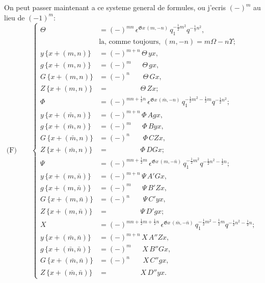 \documentclass[11pt,a4paper]{book}
\begin{document}
On peut passer maintenant a ce systeme general de formules, ou j'ecris $(-)^m$ au
lieu de $(-1)^m$:
\begin{equation*}
\text{(F)}\qquad
\left\{
\begin{aligned}
\Theta &= (-)^{mn}\, \epsilon^{\mathfrak{G}x\, (m, -n)}\, q_1^{-\frac{1}{2}m^2} q^{-\frac{1}{2}n^2},\\
&\text{la, comme toujours, } (m, -n) = m\Omega - n\Upsilon;\\
y\, \{x + (m, n)\} &= (-)^{m+n}\, \Theta\, yx,\\
g\, \{x + (m, n)\} &= (-)^m \phantom{+n}\, \Theta\, gx,\\
G\, \{x + (m, n)\} &= (-)^n \phantom{+m}\, \Theta\, Gx,\\
Z\, \{x + (m, n)\} &= \phantom{(-)^{m+n}} \Theta\, Zx;\\
\Phi &= (-)^{mn+\frac{1}{2}n}\, \epsilon^{\mathfrak{G}x\, (\bar{m}, -n)}\, q_1^{-\frac{1}{2}m^2 - \frac{1}{2}m} q^{-\frac{1}{2}n^2};\\
y\, \{x + (\bar{m}, n)\} &= (-)^{m+n}\, \Phi\, Agx,\\
g\, \{x + (\bar{m}, n)\} &= (-)^m \phantom{+n}\, \Phi\, Byx,\\
G\, \{x + (\bar{m}, n)\} &= (-)^n \phantom{+m}\, \Phi\, CZx,\\
Z\, \{x + (\bar{m}, n)\} &= \phantom{(-)^{m+n}} \Phi\, DGx;\\
\Psi &= (-)^{mn+\frac{1}{2}m}\, \epsilon^{\mathfrak{G}x\, (m, -\bar{n})}\, q_1^{-\frac{1}{2}m^2} q^{-\frac{1}{2}n^2 - \frac{1}{2}n};\\
y\, \{x + (m, \bar{n})\} &= (-)^{m+n}\, \Psi\, A'Gx,\\
g\, \{x + (m, \bar{n})\} &= (-)^m \phantom{+n}\, \Psi\, B'Zx,\\
G\, \{x + (m, \bar{n})\} &= (-)^n \phantom{+m}\, \Psi\, C'yx,\\
Z\, \{x + (m, \bar{n})\} &= \phantom{(-)^{m+n}} \Psi\, D'gx;\\
X &= (-)^{mn+\frac{1}{2}m+\frac{1}{2}n}\, \epsilon^{\mathfrak{G}x\, (\bar{m}, -\bar{n})}\, q_1^{-\frac{1}{2}m^2 - \frac{1}{2}m} q^{-\frac{1}{2}n^2 - \frac{1}{2}n};\\
y\, \{x + (\bar{m}, \bar{n})\} &= (-)^{m+n}\, X\, A''Zx,\\
g\, \{x + (\bar{m}, \bar{n})\} &= (-)^m \phantom{+n}\, X\, B''Gx,\\
G\, \{x + (\bar{m}, \bar{n})\} &= (-)^n \phantom{+m}\, X\, C''gx,\\
Z\, \{x + (\bar{m}, \bar{n})\} &= \phantom{(-)^{m+n}} X\, D''yx.
\end{aligned}
\right.
\end{equation*}
\end{document}
